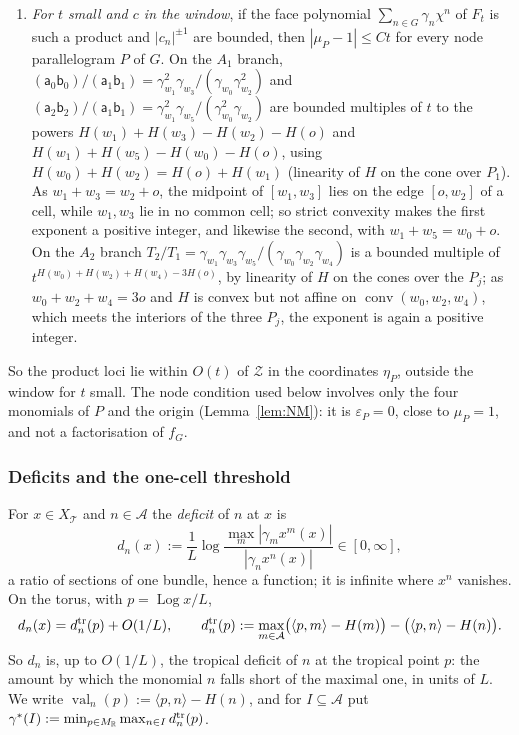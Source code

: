 \begin{remark}
\begin{enumerate}
being distinct, and the conditions $c_{w_j}<0$ force $T_1,T_2<0$, so $c_o<0$. Its
curve is three curves meeting pairwise transversally in one point each; the three points coincide exactly when $c_o=0$.
\item \emph{For $t$ small and $c$ in the window}, if the face polynomial $\sum_{n\in G}\gamma_n\chi^n$ of $F_t$ is such a product and
$|c_n|^{\pm1}$ are bounded, then $|\mu_P-1|\le Ct$ for every node parallelogram $P$ of $G$. On the $A_1$ branch,
$(\mathsf a_0\mathsf b_0)/(\mathsf a_1\mathsf b_1)=\gamma_{w_1}^2\gamma_{w_3}/(\gamma_{w_0}\gamma_{w_2}^2)$ and
$(\mathsf a_2\mathsf b_2)/(\mathsf a_1\mathsf b_1)=\gamma_{w_1}^2\gamma_{w_5}/(\gamma_{w_0}^2\gamma_{w_2})$ are bounded multiples of
$t$ to the powers $H(w_1)+H(w_3)-H(w_2)-H(o)$ and $H(w_1)+H(w_5)-H(w_0)-H(o)$, using $H(w_0)+H(w_2)=H(o)+H(w_1)$ (linearity of
$H$ on the cone over $P_1$). As $w_1+w_3=w_2+o$, the midpoint of $[w_1,w_3]$ lies on the edge $[o,w_2]$ of a cell, while
$w_1,w_3$ lie in no common cell; so strict convexity makes the first exponent a positive integer, and likewise the second,
with $w_1+w_5=w_0+o$. On the $A_2$ branch $T_2/T_1=\gamma_{w_1}\gamma_{w_3}\gamma_{w_5}/(\gamma_{w_0}\gamma_{w_2}\gamma_{w_4})$ is a
bounded multiple of $t^{H(w_0)+H(w_2)+H(w_4)-3H(o)}$, by linearity of $H$ on the cones over the $P_j$; as $w_0+w_2+w_4=3o$ and
$H$ is convex but not affine on $\operatorname{conv}(w_0,w_2,w_4)$, which meets the interiors of the three $P_j$, the exponent
is again a positive integer.
\end{enumerate}
So the product loci lie within $O(t)$ of $\mathcal Z$ in the coordinates $\eta_P$, outside the window for $t$ small. The
node condition used below involves only the four monomials of $P$ and the origin (Lemma~\ref{lem:NM}): it is
$\varepsilon_P=0$, close to $\mu_P=1$, and not a factorisation of $f_G$.
\end{remark}

\subsubsection*{Deficits and the one-cell threshold}
For $x\in X_{\mathcal T}$ and $n\in\mathcal A$ the \emph{deficit} of $n$ at $x$ is
\[
d_n(x):=\frac1L\log\frac{\max_m|\gamma_mx^m(x)|}{|\gamma_nx^n(x)|}\in[0,\infty],
\]
a ratio of sections of one bundle, hence a function; it is infinite where $x^n$ vanishes. On the torus, with
$p=\operatorname{Log}x/L$,
\begin{equation}\label{eq:tropdeficit}
d_n(x)=d^{\rm tr}_n(p)+O(1/L),\qquad d^{\rm tr}_n(p):=\max_{m\in\mathcal A}\bigl(\langle p,m\rangle-H(m)\bigr)-\bigl(\langle
p,n\rangle-H(n)\bigr).
\end{equation}
So $d_n$ is, up to $O(1/L)$, the tropical deficit of $n$ at the tropical point $p$: the amount by which the monomial
$n$ falls short of the maximal one, in units of $L$. We write $\operatorname{val}_n(p):=\langle p,n\rangle-H(n)$, and for
$I\subseteq\mathcal A$ put $\gamma^*(I):=\min_{p\in M_\mathbb R}\max_{n\in I}d^{\rm tr}_n(p)$.

